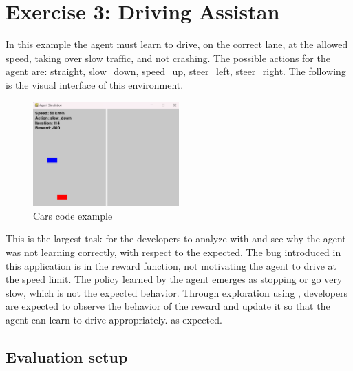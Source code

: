 \section{Exercise 3: Driving Assistan}
\label{sec:cars-eval}
In this example the agent must learn to drive, on the correct lane, at the allowed speed, taking over slow 
traffic, and not crashing. The possible actions for the agent are: straight, slow\_down, speed\_up, 
steer\_left, steer\_right. The following is the visual interface of this environment.

\begin{figure}[h]
    \centering
    \includegraphics[width=0.5\textwidth]{figures/cars_example.png}
    \caption{Cars code example}
    \label{fig:cars-code-example}
\end{figure}

This is the largest task for the developers to analyze with \flik and see why the agent was not learning
correctly, with respect to the expected. The bug introduced in this application is in the reward function,
not motivating the agent to drive at the speed limit. The policy learned by the agent emerges as stopping 
or go very slow, which is not the expected behavior. Through exploration using \flik, developers are 
expected to observe the behavior of the reward and update it so that the agent can learn to drive appropriately.
as expected.

\subsection{Evaluation setup}
\label{sec:evaluation}

